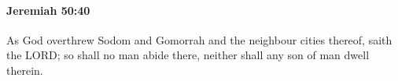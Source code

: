 
		\paragraph{Jeremiah 50:40} %
			\label{JEREMIAH-50-40}

			As God overthrew Sodom and Gomorrah and the neighbour cities thereof, saith the LORD; so shall no man abide there, neither shall any son of man dwell therein.


